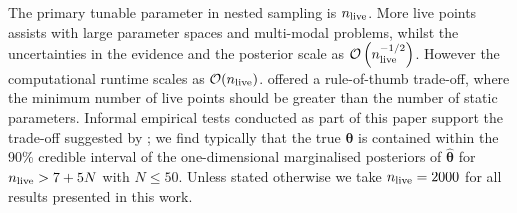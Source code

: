 \documentclass[fleqn,usenatbib,useAMS]{mnras}
\begin{document}
The primary tunable parameter in nested sampling is $n_{\rm live}$. More live points assists with large parameter spaces and multi-modal problems, whilst the uncertainties in the evidence and the posterior scale as $\mathcal{O}\left(n_{\rm live}^{-1/2}\right)$. However the computational runtime scales as $\mathcal{O}(n_{\rm live})$. \cite{Ashton2022} offered a rule-of-thumb trade-off, where the minimum number of live points should be greater than the number of static parameters. Informal empirical tests conducted as part of this paper support the trade-off suggested by \cite{Ashton2022}; we find typically that the true ${\boldsymbol{\theta}}$ is contained within the 90\% credible interval of the one-dimensional marginalised posteriors of ${\boldsymbol{\hat{\theta}}}$ for $n_{\rm live} > 7 + 5N$ with $N \leq 50$. Unless stated otherwise we take $n_{\rm live} = 2000$ for all results presented in this work. \newline 
\end{document}
